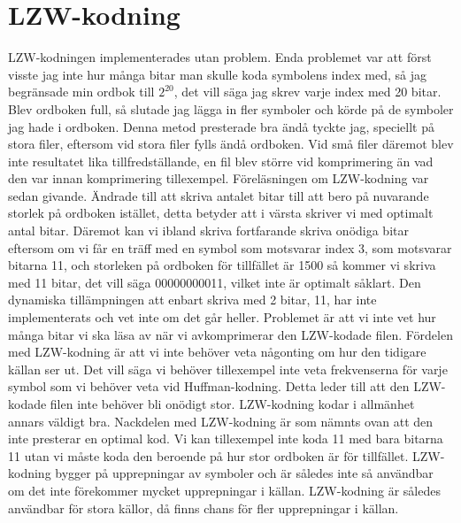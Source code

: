\section{LZW-kodning}
LZW-kodningen implementerades utan problem. Enda problemet var att först visste jag inte hur många bitar man skulle koda symbolens index med, så jag begränsade min ordbok till ${2}^{20}$, det vill säga jag skrev varje index med 20 bitar. Blev ordboken full, så slutade jag lägga in fler symboler och körde på de symboler jag hade i ordboken. Denna metod presterade bra ändå tyckte jag, speciellt på stora filer, eftersom vid stora filer fylls ändå ordboken. Vid små filer däremot blev inte resultatet lika tillfredställande, en fil blev större vid komprimering än vad den var innan komprimering tillexempel. 
Föreläsningen om LZW-kodning var sedan givande. Ändrade till att skriva antalet bitar till att bero på nuvarande storlek på ordboken istället, detta betyder att i värsta skriver vi med optimalt antal bitar. Däremot kan vi ibland skriva fortfarande skriva onödiga bitar eftersom om vi får en träff med en symbol som motsvarar index 3, som motsvarar bitarna 11, och storleken på ordboken för tillfället är 1500 så kommer vi skriva med 11 bitar, det vill säga 00000000011, vilket inte är optimalt såklart. Den dynamiska tillämpningen att enbart skriva med 2 bitar, 11, har inte implementerats och vet inte om det går heller. Problemet är att vi inte vet hur många bitar vi ska läsa av när vi avkomprimerar den LZW-kodade filen.
Fördelen med LZW-kodning är att vi inte behöver veta någonting om hur den tidigare källan ser ut. Det vill säga vi behöver tillexempel inte veta frekvenserna för varje symbol som vi behöver veta vid Huffman-kodning. Detta leder till att den LZW-kodade filen inte behöver bli onödigt stor. LZW-kodning kodar i allmänhet annars väldigt bra.
Nackdelen med LZW-kodning är som nämnts ovan att den inte presterar en optimal kod. Vi kan tillexempel inte koda 11 med bara bitarna 11 utan vi måste koda den beroende på hur stor ordboken är för tillfället. LZW-kodning bygger på upprepningar av symboler och är således inte så användbar om det inte förekommer mycket upprepningar i källan. LZW-kodning är således användbar för stora källor, då finns chans för fler upprepningar i källan. 


